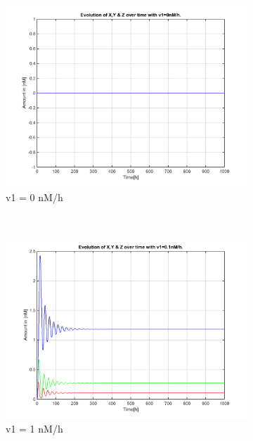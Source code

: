 \documentclass[10pt,a4paper,oneside,twocolumn]{article}
\numberwithin{equation}{section} %
\begin{document}
    \begin{figure}
    \centering
	\begin{subfigure}[b]{0.32\textwidth}
	    \includegraphics[width=\textwidth]{LotsofthesameA/A-A0.png}
	    \caption{v1 = 0 nM/h}
	\end{subfigure}
	~ 
	\begin{subfigure}[b]{0.32\textwidth}
	    \includegraphics[width=\textwidth]{LotsofthesameA/A-A1.png}
	    \caption{v1 = 1 nM/h}
	\end{subfigure}
	~ 
	\begin{subfigure}[b]{0.32\textwidth}

\end{subfigure}
\end{figure}
\end{document}
